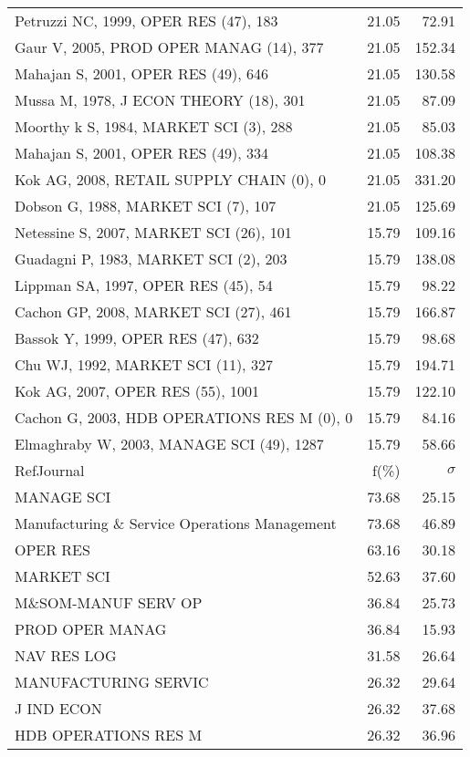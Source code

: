 \documentclass[a4paper,11pt]{report}
\begin{document}
\begin{landscape}
\begin{table}[!ht]
{\begin{tabular}{|l r r|}
Petruzzi NC, 1999, OPER RES (47), 183 & 21.05 & 72.91\\
Gaur V, 2005, PROD OPER MANAG (14), 377 & 21.05 & 152.34\\
Mahajan S, 2001, OPER RES (49), 646 & 21.05 & 130.58\\
Mussa M, 1978, J ECON THEORY (18), 301 & 21.05 & 87.09\\
Moorthy k S, 1984, MARKET SCI (3), 288 & 21.05 & 85.03\\
Mahajan S, 2001, OPER RES (49), 334 & 21.05 & 108.38\\
Kok AG, 2008, RETAIL SUPPLY CHAIN (0), 0 & 21.05 & 331.20\\
Dobson G, 1988, MARKET SCI (7), 107 & 21.05 & 125.69\\
Netessine S, 2007, MARKET SCI (26), 101 & 15.79 & 109.16\\
Guadagni P, 1983, MARKET SCI (2), 203 & 15.79 & 138.08\\
Lippman SA, 1997, OPER RES (45), 54 & 15.79 & 98.22\\
Cachon GP, 2008, MARKET SCI (27), 461 & 15.79 & 166.87\\
Bassok Y, 1999, OPER RES (47), 632 & 15.79 & 98.68\\
Chu WJ, 1992, MARKET SCI (11), 327 & 15.79 & 194.71\\
Kok AG, 2007, OPER RES (55), 1001 & 15.79 & 122.10\\
Cachon G, 2003, HDB OPERATIONS RES M (0), 0 & 15.79 & 84.16\\
Elmaghraby W, 2003, MANAGE SCI (49), 1287 & 15.79 & 58.66\\
\hline
\hline
RefJournal & f(\%) & $\sigma$\\
\hline
MANAGE SCI & 73.68 & 25.15\\
Manufacturing \& Service Operations Management & 73.68 & 46.89\\
OPER RES & 63.16 & 30.18\\
MARKET SCI & 52.63 & 37.60\\
M\&SOM-MANUF SERV OP & 36.84 & 25.73\\
PROD OPER MANAG & 36.84 & 15.93\\
NAV RES LOG & 31.58 & 26.64\\
MANUFACTURING SERVIC & 26.32 & 29.64\\
J IND ECON & 26.32 & 37.68\\
HDB OPERATIONS RES M & 26.32 & 36.96\\
\hline
\end{tabular}
}
\end{table}

\end{landscape}
\end{document}
